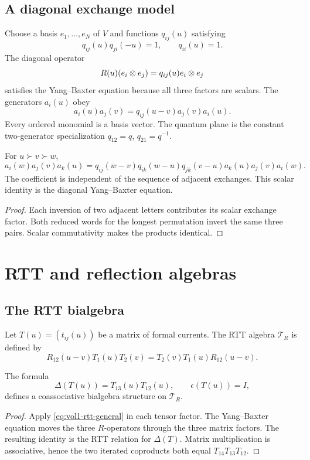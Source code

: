 \section{A diagonal exchange model}
Choose a basis $e_1,\ldots,e_N$ of $V$ and functions $q_{ij}(u)$ satisfying
\[
 q_{ij}(u)q_{ji}(-u)=1,
 \qquad q_{ii}(u)=1.
\]
The diagonal operator
\[
 R(u)(e_i\otimes e_j)=q_{ij}(u)e_i\otimes e_j
\]
satisfies the Yang--Baxter equation because all three factors are scalars.  The generators $a_i(u)$ obey
\[
 a_i(u)a_j(v)=q_{ij}(u-v)a_j(v)a_i(u).
\]
Every ordered monomial is a basis vector.  The quantum plane is the constant two-generator specialization $q_{12}=q$, $q_{21}=q^{-1}$.

\begin{calculation}
For $u\succ v\succ w$,
\[
 a_i(w)a_j(v)a_k(u)
 =q_{ij}(w-v)q_{ik}(w-u)q_{jk}(v-u)
  a_k(u)a_j(v)a_i(w).
\]
The coefficient is independent of the sequence of adjacent exchanges.  This scalar identity is the diagonal Yang--Baxter equation.
\end{calculation}
\begin{proof}
Each inversion of two adjacent letters contributes its scalar exchange factor.  Both reduced words for the longest permutation invert the same three pairs.  Scalar commutativity makes the products identical.
\end{proof}

\chapter{RTT and reflection algebras}
\section{The RTT bialgebra}
Let $T(u)=(t_{ij}(u))$ be a matrix of formal currents.  The RTT algebra $\mathcal T_R$ is defined by
\begin{equation}\label{eq:vol1-rtt-general}
 R_{12}(u-v)T_1(u)T_2(v)
 =T_2(v)T_1(u)R_{12}(u-v).
\end{equation}

\begin{theorem}
The formula
\[
 \Delta(T(u))=T_{13}(u)T_{12}(u),
 \qquad \epsilon(T(u))=I,
\]
defines a coassociative bialgebra structure on $\mathcal T_R$.
\end{theorem}
\begin{proof}
Apply \eqref{eq:vol1-rtt-general} in each tensor factor.  The Yang--Baxter equation moves the three $R$-operators through the three matrix factors.  The resulting identity is the RTT relation for $\Delta(T)$.  Matrix multiplication is associative, hence the two iterated coproducts both equal $T_{14}T_{13}T_{12}$.
\end{proof}

